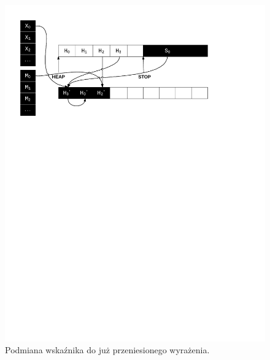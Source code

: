 \begin{figure}[p]
\centerline{\includegraphics[scale=0.75, clip, trim=10mm 185mm 45mm 10mm]{gc_4}}
\caption{Podmiana wskaźnika do już przeniesionego wyrażenia.}
\label{fig:gc4}


\end{figure}
